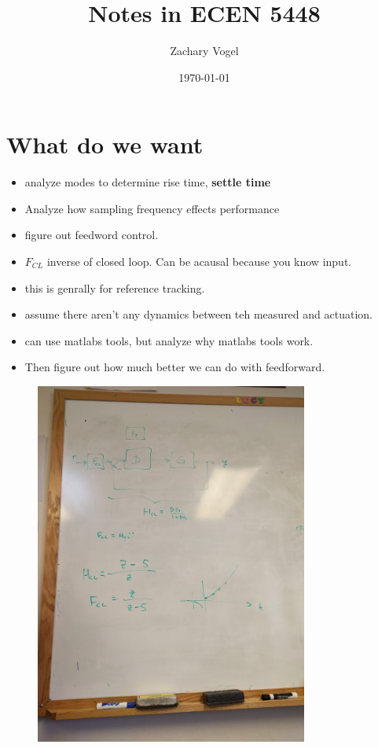 \documentclass{article}
\author{Zachary Vogel}
\date{\today}
\title{Notes in ECEN 5448}
\begin{document}
\maketitle


\section*{What do we want}

\begin{itemize}
    \item analyze modes to determine rise time, \textbf{settle time}
    \item Analyze how sampling frequency effects performance
    \item figure out feedword control.
    \item $F_{CL}$ inverse of closed loop. Can be acausal because you know input.
    \item this is genrally for reference tracking.
    \item assume there aren't any dynamics between teh measured and actuation.
    \item can use matlabs tools, but analyze why matlabs tools work.
    \item Then figure out how much better we can do with feedforward.
\end{itemize}

\begin{figure}[H]
    \centering
    \includegraphics[width=0.8\textwidth]{pic1.jpg}
\end{figure}
\end{document}
